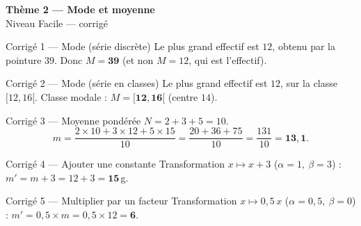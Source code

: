 \documentclass[11pt,a4paper]{article}
\newcommand{\bandeau}[2]{%
\begin{tcolorbox}[boxbase,colback=primary,colframe=primarydark,halign=center,
   before skip=2pt,after skip=12pt]
{\LARGE\bfseries\color{white} #1}\\[3pt]{\normalsize\color{white} #2}
\end{tcolorbox}}
\begin{document}
\bandeau{Thème 2 — Mode et moyenne}{Niveau Facile — corrigé}

\begin{corbox}{Corrigé 1 — Mode (série discrète)}
Le plus grand effectif est $12$, obtenu par la pointure $39$. Donc $M=\mathbf{39}$
(et non $M=12$, qui est l'effectif).
\end{corbox}

\begin{corbox}{Corrigé 2 — Mode (série en classes)}
Le plus grand effectif est $12$, sur la classe $[12,16[$. Classe modale : $M=\mathbf{[12,16[}$
(centre $14$).
\end{corbox}

\begin{corbox}{Corrigé 3 — Moyenne pondérée}
$N=2+3+5=10$.
\[
m=\frac{2\times10+3\times12+5\times15}{10}=\frac{20+36+75}{10}=\frac{131}{10}=\mathbf{13{,}1}.
\]
\end{corbox}

\begin{corbox}{Corrigé 4 — Ajouter une constante}
Transformation $x\mapsto x+3$ ($\alpha=1,\ \beta=3$) : $m'=m+3=12+3=\mathbf{15}$\,g.
\end{corbox}

\begin{corbox}{Corrigé 5 — Multiplier par un facteur}
Transformation $x\mapsto 0{,}5\,x$ ($\alpha=0{,}5,\ \beta=0$) : $m'=0{,}5\times m=0{,}5\times12=\mathbf{6}$.
\end{corbox}
\end{document}
